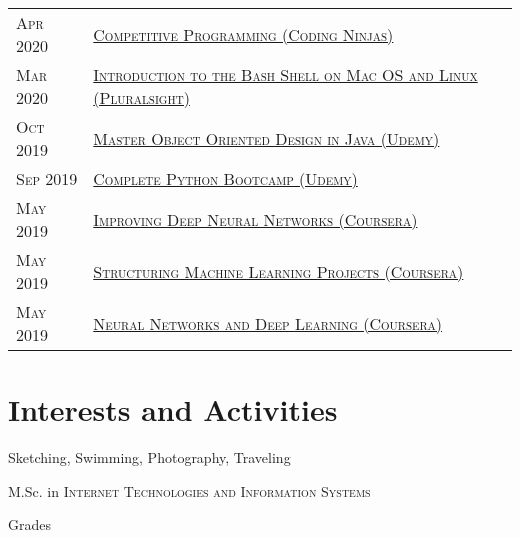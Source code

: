 \documentclass[a4paper,10pt]{article} %
\begin{document}
\begin{tabular}{ll}
\textsc{Apr 2020} & \href{https://ninjasfiles.s3.amazonaws.com/certificate643308086b235198c8d9aa73fa674fe417597e.pdf}{\textsc{Competitive Programming (Coding Ninjas)}}\\
\textsc{Mar 2020} & \href{}{\textsc{Introduction to the Bash Shell on Mac OS and Linux (Pluralsight)}}\\
\textsc{Oct 2019} & \href{https://www.udemy.com/certificate/UC-1EV6KK7F/}{\textsc{Master Object Oriented Design in Java (Udemy)}}\\
\textsc{Sep 2019} & \href{https://www.udemy.com/certificate/UC-P7AJYXY6/}{\textsc{Complete Python Bootcamp (Udemy)}}\\
\textsc{May 2019} & \href{https://www.coursera.org/account/accomplishments/verify/XN25BG7WGAM3}{\textsc{Improving Deep Neural Networks (Coursera)}}\\
\textsc{May 2019} & \href{https://www.coursera.org/account/accomplishments/certificate/LWCFY27WJB9R}{\textsc{Structuring Machine Learning Projects (Coursera)}}\\
\textsc{May 2019} & \href{https://www.coursera.org/account/accomplishments/verify/KCVQACF5SKEM}{\textsc{Neural Networks and Deep Learning (Coursera)}}\\
\end{tabular}


\section{Interests and Activities}

Sketching, Swimming, Photography, Traveling

\newpage
\enlargethispage{6\baselineskip}

\par{\centering\Large \hypertarget{grds_itis}{M.Sc. in \textsc{Internet Technologies and Information Systems}}\par}\large{\centering Grades\par}\normalsize
\end{document}
